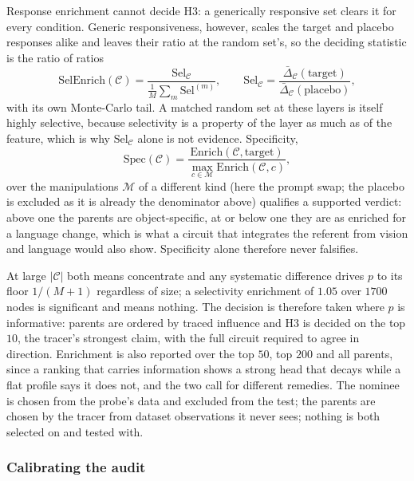 Response enrichment cannot decide H3: a generically responsive set clears it
for every condition. Generic responsiveness, however, scales the target and
placebo responses alike and leaves their ratio at the random set's, so the
deciding statistic is the ratio of ratios
\begin{equation}
\mathrm{SelEnrich}(\mathcal{C})=\frac{\mathrm{Sel}_{\mathcal{C}}}
{\frac{1}{M}\sum_m \mathrm{Sel}^{(m)}},
\qquad
\mathrm{Sel}_{\mathcal{C}}=\frac{\bar{\Delta}_{\mathcal{C}}(\mathrm{target})}
{\bar{\Delta}_{\mathcal{C}}(\mathrm{placebo})},
\label{eq:sel-enrich}
\end{equation}
with its own Monte-Carlo tail. A matched random set at these layers is itself
highly selective, because selectivity is a property of the layer as much as of
the feature, which is why $\mathrm{Sel}_{\mathcal{C}}$ alone is not evidence.
Specificity,
\begin{equation}
\mathrm{Spec}(\mathcal{C})=\frac{\mathrm{Enrich}(\mathcal{C},\mathrm{target})}
{\max_{c\in\mathcal{M}}\mathrm{Enrich}(\mathcal{C},c)},
\label{eq:specificity}
\end{equation}
over the manipulations $\mathcal{M}$ of a different kind (here the prompt swap;
the placebo is excluded as it is already the denominator above) qualifies a
supported verdict: above one the parents are object-specific, at or below one
they are as enriched for a language change, which is what a circuit that
integrates the referent from vision and language would also show. Specificity
alone therefore never falsifies.

At large $|\mathcal{C}|$ both means concentrate and any systematic difference
drives $p$ to its floor $1/(M+1)$ regardless of size; a selectivity enrichment
of $1.05$ over $1700$ nodes is significant and means nothing. The decision is
therefore taken where $p$ is informative: parents are ordered by traced
influence and H3 is decided on the top $10$, the tracer's strongest claim, with
the full circuit required to agree in direction. Enrichment is also reported
over the top $50$, top $200$ and all parents, since a ranking that carries
information shows a strong head that decays while a flat profile says it does
not, and the two call for different remedies. The nominee is chosen from the
probe's data and excluded from the test; the parents are chosen by the tracer
from dataset observations it never sees; nothing is both selected on and tested
with.

\subsubsection{Calibrating the audit}
\label{sec:calibration}

